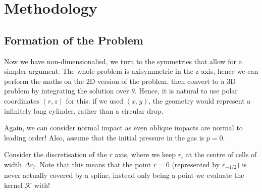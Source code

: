 \documentclass[11pt,a4paper]{article}
\begin{document}
	
	
	
	
	
	
	
	
		\section{Methodology}
	
	\subsection{Formation of the Problem}
	Now we have non-dimensionalisd, we turn to the symmetries that allow for a simpler argument.
	The whole problem is axisymmetric in the z axis, hence we can perform the maths on the 2D version of the problem, then convert to a 3D problem by integrating the solution over $\theta$. Hence, it is natural to use polar coordinates $(r,z)$ for this: if we used $(x,y)$, the geometry would represent a infinitely long cylinder, rather than a circular drop.
	
	Again, we can consider normal impact as even oblique impacts are normal to leading order!
	Also, assume that the initial pressure in the gas is $p = 0$.
	
	Consider the discretisation of the $r$ axis, where we keep $r_i$ at the centre of cells of width $\Delta r_i$. Note that this means that the point $r = 0$ (represented by $r_{-1/2}$) is never actually covered by a spline, instead only being a point we evaluate the kernel $\mathcal{K}$ with!
\end{document}
